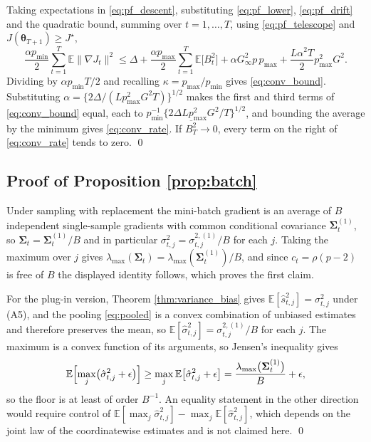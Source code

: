 \documentclass[pdflatex,sn-mathphys-num]{sn-jnl}%
\theoremstyle{thmstyleone}%
\theoremstyle{thmstyletwo}%
\theoremstyle{thmstylethree}%
\newcommand{\E}{\mathbb{E}}
\begin{document}
\begin{appendices}
Taking expectations in \eqref{eq:pf_descent}, substituting \eqref{eq:pf_lower}, \eqref{eq:pf_drift} and the quadratic bound, summing over $t=1,\dots,T$, using \eqref{eq:pf_telescope} and $J(\bm\theta_{T+1})\ge J^\star$,
\begin{equation}
\frac{\alpha p_{\min}}{2}\sum_{t=1}^{T}\E\|\nabla J_t\|^{2}
\le
\Delta
+\frac{\alpha p_{\max}}{2}\sum_{t=1}^{T}\E\bigl[B^2_t\bigr]
+\alpha G_\infty^{2}p\,p_{\max}
+\frac{L\alpha^{2}T}{2}p^{2}_{\max}G^{2}.
\end{equation}
Dividing by $\alpha p_{\min}T/2$ and recalling $\kappa=p_{\max}/p_{\min}$ gives \eqref{eq:conv_bound}. Substituting $\alpha=\{2\Delta/(Lp^2_{\max}G^2T)\}^{1/2}$ makes the first and third terms of \eqref{eq:conv_bound} equal, each to $p_{\min}^{-1}\{2\Delta Lp^2_{\max}G^2/T\}^{1/2}$, and bounding the average by the minimum gives \eqref{eq:conv_rate}. If $\overline{B^2_T}\to0$, every term on the right of \eqref{eq:conv_rate} tends to zero. \qed

\subsection*{Proof of Proposition \ref{prop:batch}}

Under sampling with replacement the mini-batch gradient is an average of $B$ independent single-sample gradients with common conditional covariance $\bm\Sigma^{(1)}_t$, so $\bm\Sigma_t=\bm\Sigma^{(1)}_t/B$ and in particular $\sigma^2_{t,j}=\sigma^{2,(1)}_{t,j}/B$ for each $j$. Taking the maximum over $j$ gives $\lambda_{\max}(\bm\Sigma_t)=\lambda_{\max}(\bm\Sigma^{(1)}_t)/B$, and since $c_t=\rho(p-2)$ is free of $B$ the displayed identity follows, which proves the first claim.

For the plug-in version, Theorem \ref{thm:variance_bias} gives $\E[\hat s^2_{t,j}]=\sigma^2_{t,j}$ under (A5), and the pooling \eqref{eq:pooled} is a convex combination of unbiased estimates and therefore preserves the mean, so $\E[\hat\sigma^2_{t,j}]=\sigma^{2,(1)}_{t,j}/B$ for each $j$. The maximum is a convex function of its arguments, so Jensen's inequality gives
\begin{equation}
\E\Bigl[\max_j\bigl(\hat\sigma^2_{t,j}+\epsilon\bigr)\Bigr]
\ge
\max_j\E\bigl[\hat\sigma^2_{t,j}+\epsilon\bigr]
=\frac{\lambda_{\max}\bigl(\bm\Sigma^{(1)}_t\bigr)}{B}+\epsilon ,
\end{equation}
so the floor is at least of order $B^{-1}$. An equality statement in the other direction would require control of $\E[\max_j\hat\sigma^2_{t,j}]-\max_j\E[\hat\sigma^2_{t,j}]$, which depends on the joint law of the coordinatewise estimates and is not claimed here. \qed

\end{appendices}


\end{document}
